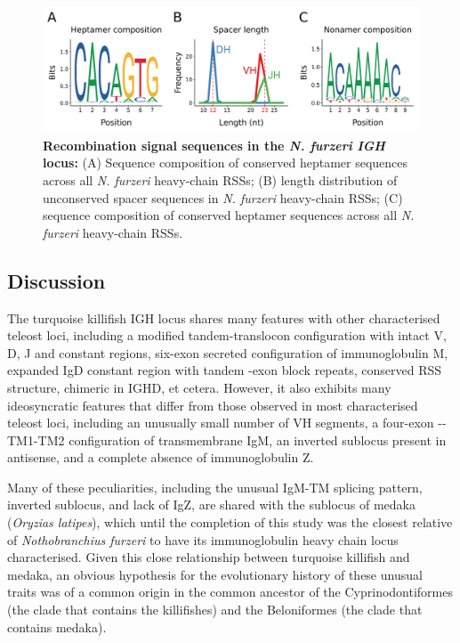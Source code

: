 	\begin{figure}
	\includegraphics[width=\textwidth]{_Figures/png/nfu-rss-seqlogo-all}
	\caption[Recombination signal sequences in the \textit{N. furzeri} \textit{IGH} locus]{\textbf{Recombination signal sequences in the \textit{N. furzeri} \textit{IGH} locus:} (A) Sequence composition of conserved heptamer sequences across all \textit{N. furzeri} heavy-chain RSSs; (B) length distribution of unconserved spacer sequences in \textit{N. furzeri} heavy-chain RSSs; (C) sequence composition of conserved heptamer sequences across all \textit{N. furzeri} heavy-chain RSSs.}
	\label{fig:nfu-rss-seqlogo-all}
	\end{figure} %
	
	



	
	\subsection{Discussion}
	
	The turquoise killifish IGH locus shares many features with other characterised teleost loci, including a modified tandem-translocon configuration with intact V, D, J and constant regions, six-exon secreted configuration of immunoglobulin M, expanded IgD constant region with tandem \cd{}-exon block repeats, conserved RSS structure, chimeric  in IGHD, et cetera. However, it also exhibits many ideosyncratic features that differ from those observed in most characterised teleost loci, including an unusually small number of VH segments, a four-exon --TM1-TM2 configuration of transmembrane IgM, an inverted sublocus present in antisense, and a complete absence of immunoglobulin Z. 
	
	Many of these peculiarities, including the unusual IgM-TM splicing pattern, inverted sublocus, and lack of IgZ, are shared with the sublocus of medaka (\textit{Oryzias latipes}), which until the completion of this study was the closest relative of \textit{Nothobranchius furzeri} to have its immunoglobulin heavy chain locus characterised. Given this close relationship between turquoise killifish and medaka, an obvious hypothesis for the evolutionary history of these unusual traits was of a common origin in the common ancestor of the Cyprinodontiformes (the clade that contains the killifishes) and the Beloniformes (the clade that contains medaka). %

